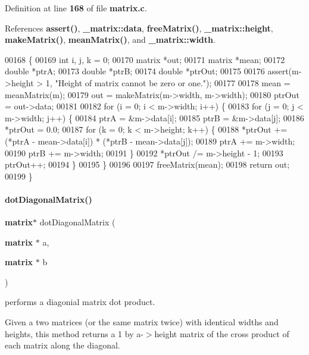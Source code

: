 Definition at line \textbf{ 168} of file \textbf{ matrix.\+c}.



References \textbf{ assert()}, \textbf{ \+\_\+matrix\+::data}, \textbf{ free\+Matrix()}, \textbf{ \+\_\+matrix\+::height}, \textbf{ make\+Matrix()}, \textbf{ mean\+Matrix()}, and \textbf{ \+\_\+matrix\+::width}.


\begin{DoxyCode}
00168                                     \{
00169   \textcolor{keywordtype}{int} i, j, k = 0;
00170   matrix *out;
00171   matrix *mean;
00172   \textcolor{keywordtype}{double} *ptrA;
00173   \textcolor{keywordtype}{double} *ptrB;
00174   \textcolor{keywordtype}{double} *ptrOut;
00175 
00176   assert(m->height > 1, \textcolor{stringliteral}{"Height of matrix cannot be zero or one."});
00177 
00178   mean = meanMatrix(m);
00179   out = makeMatrix(m->width, m->width);
00180   ptrOut = out->data;
00181 
00182   \textcolor{keywordflow}{for} (i = 0; i < m->width; i++) \{
00183     \textcolor{keywordflow}{for} (j = 0; j < m->width; j++) \{
00184       ptrA = &m->data[i];
00185       ptrB = &m->data[j];
00186       *ptrOut = 0.0;
00187       \textcolor{keywordflow}{for} (k = 0; k < m->height; k++) \{
00188         *ptrOut += (*ptrA - mean->data[i]) * (*ptrB - mean->data[j]);
00189         ptrA += m->width;
00190         ptrB += m->width;
00191       \}
00192       *ptrOut /= m->height - 1;
00193       ptrOut++;
00194     \}
00195   \}
00196 
00197   freeMatrix(mean);
00198   \textcolor{keywordflow}{return} out;
00199 \}
\end{DoxyCode}
\mbox{\label{a00125_af49b525d7476c365833db9acd975e3a5}} 
\paragraph{dot\+Diagonal\+Matrix()}
{\footnotesize\ttfamily \textbf{ matrix}$\ast$ dot\+Diagonal\+Matrix (\begin{DoxyParamCaption}\item[{\textbf{ matrix} $\ast$}]{a,  }\item[{\textbf{ matrix} $\ast$}]{b }\end{DoxyParamCaption})}



performs a diagonial matrix dot product. 

Given a two matrices (or the same matrix twice) with identical widths and heights, this method returns a 1 by a-\/$>$height matrix of the cross product of each matrix along the diagonal.

